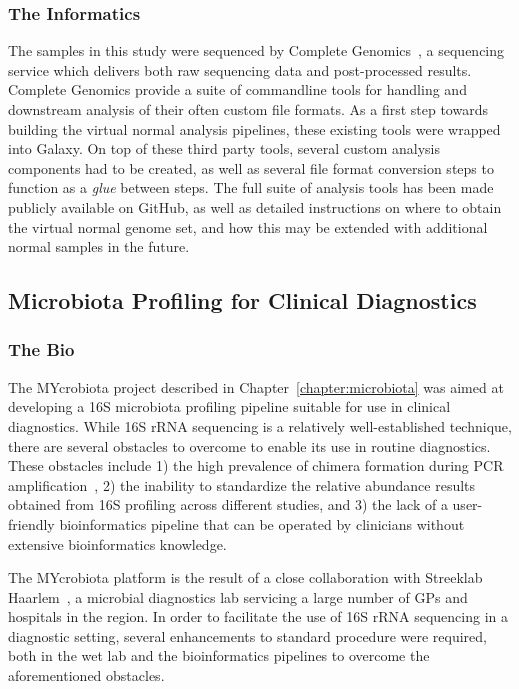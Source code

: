 \subsubsection{The Informatics}
The samples in this study were sequenced by Complete Genomics~\cite{drmanac}, a sequencing service which delivers both raw sequencing data and post-processed results. Complete Genomics provide a suite of commandline tools for handling and downstream analysis of their often custom file formats. As a first step towards building the virtual normal analysis pipelines, these existing tools were wrapped into Galaxy. On top of these third party tools, several custom analysis components had to be created, as well as several file format conversion steps to function as a \emph{glue} between steps. The full suite of analysis tools has been made publicly available on GitHub, as well as detailed instructions on where to obtain the virtual normal genome set, and how this may be extended with additional normal samples in the future.


\subsection{Microbiota Profiling for Clinical Diagnostics}
\subsubsection{The Bio}
The MYcrobiota project described in Chapter~\ref{chapter:microbiota} was aimed at developing a 16S microbiota profiling pipeline suitable for use in clinical diagnostics. While 16S rRNA sequencing is a relatively well-established technique, there are several obstacles to overcome to enable its use in routine diagnostics. These obstacles include 1) the high prevalence of chimera formation during PCR amplification~\cite{huttenhower2012structure}, 2) the inability to standardize the relative abundance results obtained from 16S profiling across different studies, and 3) the lack of a user-friendly bioinformatics pipeline that can be operated by clinicians without extensive bioinformatics knowledge.

The MYcrobiota platform is the result of a close collaboration with Streeklab Haarlem~\cite{url-streeklab}, a microbial diagnostics lab servicing a large number of GPs and hospitals in the region. In order to facilitate the use of 16S rRNA sequencing in a diagnostic setting, several enhancements to standard procedure were required, both in the wet lab and the bioinformatics pipelines to overcome the aforementioned obstacles.

